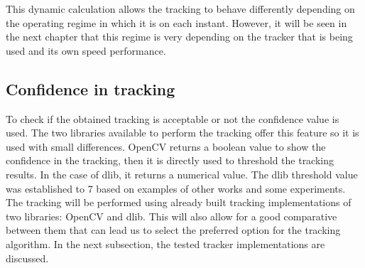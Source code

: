 This dynamic calculation allows the tracking to behave differently depending on the operating regime in which it is on each instant. However, it will be seen in the next chapter that this regime is very depending on the tracker that is being used and its own speed performance.\\

\subsection{Confidence in tracking}\label{conf_in_tracking}
To check if the obtained tracking is acceptable or not the confidence value is used. The two libraries available to perform the tracking offer this feature so it is used with small differences. OpenCV returns a boolean value to show the confidence in the tracking, then it is directly used to threshold the tracking results. In the case of dlib, it returns a numerical value. The dlib threshold value was established to 7 based on examples of other works and some experiments.\\
The tracking will be performed using already built tracking implementations of two libraries: OpenCV and dlib. This will also allow for a good comparative between them that can lead us to select the preferred option for the tracking algorithm. In the next subsection, the tested tracker implementations are discussed.
